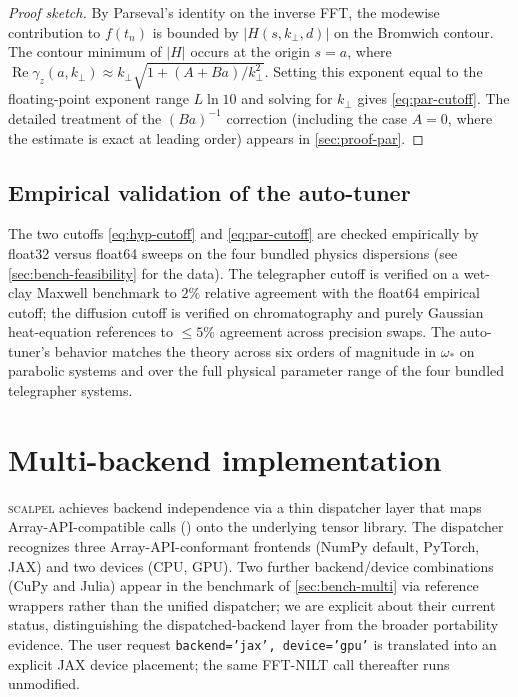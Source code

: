 \documentclass[manuscript,review]{acmart}
\newcommand{\kperp}{k_\perp}
\newcommand{\gammaz}{\gamma_z}
\newcommand{\wcross}{\omega_*}
\newcommand{\Real}{\operatorname{Re}}
\newcommand{\scalpel}{\textsc{scalpel}}
\begin{document}
\begin{proof}[Proof sketch]
By Parseval's identity on the inverse FFT, the modewise contribution
to $f(t_n)$ is bounded by $|H(s, \kperp, d)|$ on the Bromwich
contour. The contour minimum of $|H|$ occurs at the origin
$s = a$, where $\Real\gammaz(a, \kperp) \approx \kperp\sqrt{1 + (A
+ Ba)/\kperp^2}$. Setting this exponent equal to the
floating-point exponent range $L \ln 10$ and solving for $\kperp$
gives \cref{eq:par-cutoff}. The detailed treatment of the
$(Ba)^{-1}$ correction (including the case $A = 0$, where the
estimate is exact at leading order) appears in
\cref{sec:proof-par}.
\end{proof}

\subsection{Empirical validation of the auto-tuner}

The two cutoffs \cref{eq:hyp-cutoff} and \cref{eq:par-cutoff} are
checked empirically by float32 versus float64 sweeps on the four
bundled physics dispersions (see \cref{sec:bench-feasibility} for the
data). The telegrapher cutoff is verified on a wet-clay Maxwell
benchmark to $2\%$ relative agreement with the float64 empirical
cutoff; the diffusion cutoff is verified on chromatography and
purely Gaussian heat-equation references to $\le 5\%$ agreement
across precision swaps. The auto-tuner's behavior matches the
theory across six orders of magnitude in $\wcross$ on parabolic
systems and over the full physical parameter range of the four
bundled telegrapher systems.

\section{Multi-backend implementation}\label{sec:backends}

\scalpel{} achieves backend independence via a thin dispatcher
layer that maps Array-API-compatible calls
(\cite{arrayapi2022}) onto the underlying tensor library. The
dispatcher recognizes three Array-API-conformant frontends
(NumPy default, PyTorch, JAX) and two devices (CPU, GPU). Two
further backend/device combinations (CuPy and Julia) appear in the
benchmark of \cref{sec:bench-multi} via reference wrappers rather
than the unified dispatcher; we are explicit about their current
status, distinguishing the dispatched-backend layer from the
broader portability evidence. The user request
\texttt{backend='jax', device='gpu'} is translated into an explicit
JAX device placement; the same FFT-NILT call thereafter runs
unmodified.
\end{document}
